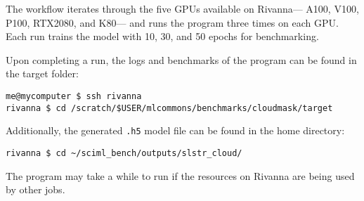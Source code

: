 The workflow iterates through the five GPUs available on Rivanna---
A100, V100, P100, RTX2080, and K80--- and runs the program three times
on each GPU. Each run trains the model with 10, 30, and 50 epochs for
benchmarking.

Upon completing a run, the logs and benchmarks of the program can be
found in the target folder:

\bigbreak
\begin{verbatim}
me@mycomputer $ ssh rivanna
rivanna $ cd /scratch/$USER/mlcommons/benchmarks/cloudmask/target
\end{verbatim}
\bigbreak

Additionally, the generated \texttt{.h5} model file can be found in the
home directory:

\bigbreak
\begin{verbatim}
rivanna $ cd ~/sciml_bench/outputs/slstr_cloud/
\end{verbatim}
\bigbreak

The program may take a while to run if the resources on Rivanna are
being used by other jobs.
